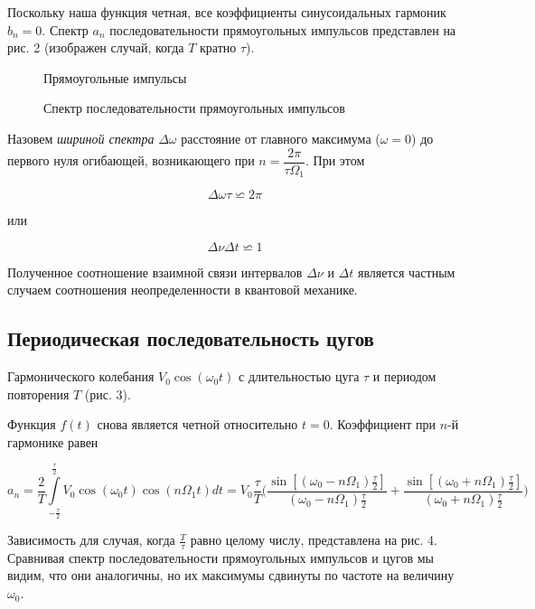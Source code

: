 \documentclass[a4paper, 14pt]{extarticle}%
\begin{document}
	Поскольку наша функция четная, все коэффициенты синусоидальных гармоник $b_{n}=0$. Спектр $a_{n}$ последовательности прямоугольных импульсов представлен на рис. 2 (изображен случай, когда $T$ кратно $\tau$).
		
		
		\begin{figure}[h]
			\begin{minipage}[h]{0.5\linewidth}
				\caption{Прямоугольные импульсы}
			\end{minipage}
			\begin{minipage}[h]{0.5\linewidth}
				\caption{Спектр последовательности прямоугольных импульсов}
			\end{minipage}
		\end{figure}
	
	Назовем \textit{шириной спектра} $\Delta \omega$ расстояние от главного максимума ($\omega =0$) до первого нуля огибающей, возникающего при $n=\dfrac{2\pi}{\tau \Omega_{1}}$. При этом 

	$$\Delta \omega \tau \backsimeq 2 \pi $$
	
	 или 
	
\begin{equation}\label{neopr}
	\Delta \nu \Delta t \backsimeq 1
\end{equation}
		
	Полученное соотношение взаимной связи интервалов $\Delta \nu$ и $\Delta t$ является
	частным случаем соотношения неопределенности в квантовой механике.
	
	\subsection{Периодическая последовательность цугов} 
	Гармонического колебания $V_{0}\cos(\omega_{0}t)$ с длительностью цуга $\tau$ и периодом повторения $T$ (рис. 3).
	
	Функция $f(t)$ снова является четной относительно $t=0$. Коэффициент при $n$-й гармонике равен
	
	$$a_{n}=\dfrac{2}{T}\int\limits_{-\frac{\tau}{2}}^{\frac{\tau}{2}}V_{0}\cos(\omega_{0}t)\cos(n \Omega_{1} t)dt=V_{0}\dfrac{\tau}{T} \bigg(\dfrac{\sin[(\omega_{0}-n\Omega_{1})\frac{\tau}{2}]}{(\omega_{0}-n\Omega_{1})\frac{\tau}{2}}+\dfrac{\sin[(\omega_{0}+n\Omega_{1})\frac{\tau}{2}]}{(\omega_{0}+n\Omega_{1})\frac{\tau}{2}} \bigg)$$ 
	
	Зависимость для случая, когда $\frac{T}{\tau}$ равно целому числу, представлена на рис. 4. Сравнивая спектр последовательности прямоугольных импульсов и цугов мы видим, что они аналогичны, но их максимумы сдвинуты по частоте на величину $\omega_{0}$.
	
\end{document}
